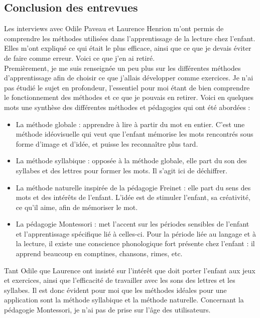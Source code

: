 \subsection{Conclusion des entrevues}
Les interviews avec Odile Paveau et Laurence Henrion m'ont permis de comprendre les méthodes utilisées dans l'apprentissage de la lecture chez l'enfant. Elles m'ont expliqué ce qui était le plus efficace, ainsi que ce que je devais éviter de faire comme erreur. Voici ce que j'en ai retiré.\\

Premièrement, je me suis renseignée un peu plus sur les différentes méthodes d'apprentissage afin de choisir ce que j'allais développer comme exercices. Je n'ai pas étudié le sujet en profondeur, l'essentiel pour moi étant de bien comprendre le fonctionnement des méthodes et ce que je pouvais en retirer. Voici en quelques mots une synthèse des différentes méthodes et pédagogies qui ont été abordées :
\begin{itemize}
\item La méthode globale : apprendre à lire à partir du mot en entier. C'est une méthode idéovisuelle qui veut que l'enfant mémorise les mots rencontrés sous forme d'image et d'idée, et puisse les reconnaître plus tard.
\item La méthode syllabique : opposée à la méthode globale, elle part du son des syllabes et des lettres pour former les mots. Il s'agit ici de déchiffrer.
\item La méthode naturelle inspirée de la pédagogie Freinet : elle part du sens des mots et des intérêts de l'enfant. L'idée est de stimuler l'enfant, sa créativité, ce qu'il aime, afin de mémoriser le mot.
\item La pédagogie Montessori : met l'accent sur les périodes sensibles de l'enfant et l'apprentissage spécifique lié à celles-ci. Pour la période liée au langage et à la lecture, il existe une conscience phonologique fort présente chez l'enfant : il apprend beaucoup en comptines, chansons, rimes, etc.
\end{itemize}
Tant Odile que Laurence ont insisté sur l'intérêt que doit porter l'enfant aux jeux et exercices, ainsi que l'efficacité de travailler avec les sons des lettres et les syllabes. Il est donc évident pour moi que les méthodes idéales pour une application sont la méthode syllabique et la méthode naturelle. Concernant la pédagogie Montessori, je n'ai pas de prise sur l'âge des utilisateurs.\\

